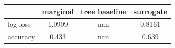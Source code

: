 \begin{tabular}{lccc}
\toprule
 & marginal & tree baseline & surrogate \\
\midrule
log loss & 1.0909 & nan & 0.8161 \\
accuracy & 0.433 & nan & 0.639 \\
\bottomrule
\end{tabular}
